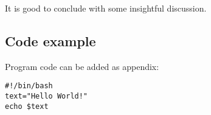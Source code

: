 \documentclass[finnish,twoside,openright]{HYgraduMLDS}
\begin{document}
It is good to conclude with some insightful discussion. 


\cleardoublepage %



\begin{appendices}
\myappendixtitle

\chapter{Code example\label{appendix:code}}
Program code can be added as appendix:
\begin{verbatim}
#!/bin/bash          
text="Hello World!"
echo $text
\end{verbatim}

\end{appendices}
\end{document}
